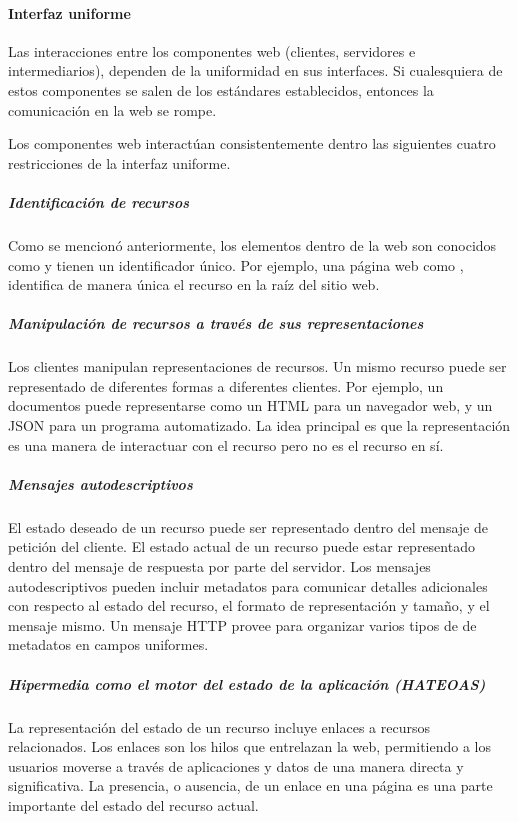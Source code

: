 \paragraph{Interfaz uniforme}
\label{\detokenize{chapter_one/rest:interfaz-uniforme}}
Las interacciones entre los componentes web (clientes, servidores e intermediarios),
dependen de la uniformidad en sus interfaces. Si cualesquiera de estos componentes se
salen de los estándares establecidos, entonces la comunicación en la web
se rompe.

Los componentes web interactúan consistentemente dentro las siguientes
cuatro restricciones de la interfaz uniforme.


\subparagraph{Identificación de recursos}
\label{\detokenize{chapter_one/rest:identificacion-de-recursos}}
Como se mencionó anteriormente, los elementos dentro de la web son
conocidos como  y tienen un identificador único. Por ejemplo, una
página web como , identifica de manera única el
recurso en la raíz del sitio web.


\subparagraph{Manipulación de recursos a través de sus representaciones}
\label{\detokenize{chapter_one/rest:manipulacion-de-recursos-a-traves-de-sus-representaciones}}
Los clientes manipulan representaciones de recursos. Un mismo
recurso puede ser representado de diferentes formas a diferentes
clientes. Por ejemplo, un documentos puede representarse como un HTML
para un navegador web, y un JSON para un programa automatizado. La idea
principal es que la representación es una manera de interactuar con el recurso
pero no es el recurso en sí.


\subparagraph{Mensajes autodescriptivos}
\label{\detokenize{chapter_one/rest:mensajes-autodescriptivos}}
El estado deseado de un recurso puede ser representado dentro del mensaje
de petición del cliente. El estado actual de un recurso puede estar representado
dentro del mensaje de respuesta por parte del servidor.
Los mensajes autodescriptivos pueden incluir metadatos para comunicar
detalles adicionales con respecto al estado del recurso, el formato
de representación y tamaño, y el mensaje mismo.
Un mensaje HTTP provee  para organizar varios tipos de
de metadatos en campos uniformes.


\subparagraph{Hipermedia como el motor del estado de la aplicación (HATEOAS)}
\label{\detokenize{chapter_one/rest:hipermedia-como-el-motor-del-estado-de-la-aplicacion-hateoas}}
La representación del estado de un recurso incluye enlaces a recursos
relacionados. Los enlaces son los hilos que entrelazan la web, permitiendo
a los usuarios moverse a través de aplicaciones y datos de una manera directa
y significativa. La presencia, o ausencia, de un enlace en una página es una
parte importante del estado del recurso actual.


